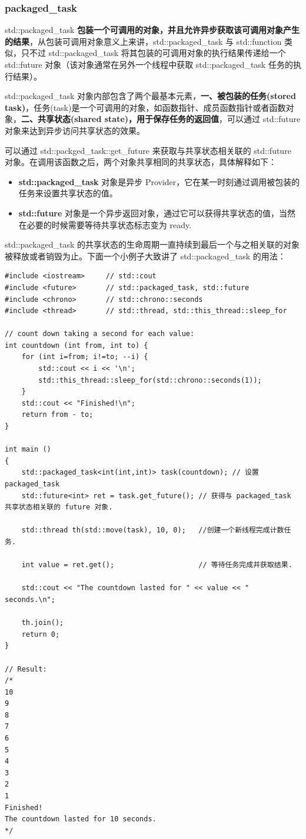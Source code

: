 \documentclass[UTF8,a4paper,12pt]{ctexbook}
\begin{document}
		\subsubsection{packaged\_task}
			std::packaged\_task \textbf{包装一个可调用的对象，并且允许异步获取该可调用对象产生的结果}，从包装可调用对象意义上来讲，std::packaged\_task 与 std::function 类似，只不过 std::packaged\_task 将其包装的可调用对象的执行结果传递给一个 std::future 对象（该对象通常在另外一个线程中获取 std::packaged\_task 任务的执行结果）。
			
			std::packaged\_task 对象内部包含了两个最基本元素，\textbf{一、被包装的任务(stored task)}，任务(task)是一个可调用的对象，如函数指针、成员函数指针或者函数对象，\textbf{二、共享状态(shared state)，用于保存任务的返回值}，可以通过 std::future 对象来达到异步访问共享状态的效果。
			
			可以通过 std::packged\_task::get\_future 来获取与共享状态相关联的 std::future 对象。在调用该函数之后，两个对象共享相同的共享状态，具体解释如下：
			\begin{itemize}
				\item \textbf{std::packaged\_task} 对象是异步 Provider，它在某一时刻通过调用被包装的任务来设置共享状态的值。
				\item \textbf{std::future} 对象是一个异步返回对象，通过它可以获得共享状态的值，当然在必要的时候需要等待共享状态标志变为 ready.
			\end{itemize}
	
			std::packaged\_task 的共享状态的生命周期一直持续到最后一个与之相关联的对象被释放或者销毁为止。下面一个小例子大致讲了 std::packaged\_task 的用法：
			\begin{lstlisting}
#include <iostream>     // std::cout
#include <future>       // std::packaged_task, std::future
#include <chrono>       // std::chrono::seconds
#include <thread>       // std::thread, std::this_thread::sleep_for

// count down taking a second for each value:
int countdown (int from, int to) {
	for (int i=from; i!=to; --i) {
		std::cout << i << '\n';
		std::this_thread::sleep_for(std::chrono::seconds(1));
	}
	std::cout << "Finished!\n";
	return from - to;
}

int main ()
{
	std::packaged_task<int(int,int)> task(countdown); // 设置 packaged_task
	std::future<int> ret = task.get_future(); // 获得与 packaged_task 共享状态相关联的 future 对象.
	
	std::thread th(std::move(task), 10, 0);   //创建一个新线程完成计数任务.
	
	int value = ret.get();                    // 等待任务完成并获取结果.
	
	std::cout << "The countdown lasted for " << value << " seconds.\n";
	
	th.join();
	return 0;
}	

// Result:
/*
10
9
8
7
6
5
4
3
2
1
Finished!
The countdown lasted for 10 seconds.
*/			
			\end{lstlisting}
\end{document}
